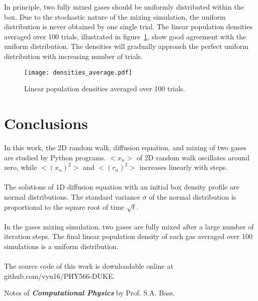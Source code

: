 \documentclass{article}
\begin{document}
In principle, two fully mixed gases should be uniformly distributed within the box. Due to the stochastic nature of the mixing simulation, the uniform distribution is never obtained by one single trial. The linear population densities averaged over 100 trials, illustrated in figure~\ref{average100}, show good agreement with the uniform distribution. The densities will gradually approach the perfect uniform distribution with increasing number of trials.

\begin{figure}[h!]
\centering
\texttt{[image: densities\_average.pdf]}
\caption{Linear population densities averaged over 100 trials.}
\label{average100}
\end{figure}

\section{Conclusions}
In this work, the 2D random walk, diffusion equation, and mixing of two gases are studied by Python programs. $<x_n>$ of 2D random walk oscillates around zero, while $<(x_n)^2>$ and $<(r_n)^2>$ increases linearly with steps.\\
\\
The solutions of 1D diffusion equation with an initial box density profile are normal distributions. The standard variance $\sigma$ of the normal distribution is proportional to the square root of time $\sqrt{t}$.\\
\\
In the gases mixing simulation, two gases are fully mixed after a large number of iteration steps. The final linear population density of each gas averaged over 100 simulations is a uniform distribution.\\
\\
The source code of this work is downloadable online at github.com/vyu16/PHY566-DUKE.

\begin{thebibliography}{9}
Notes of \textbf{\textit{Computational Physics}} by Prof. S.A. Bass.
\end{thebibliography}
\end{document}
